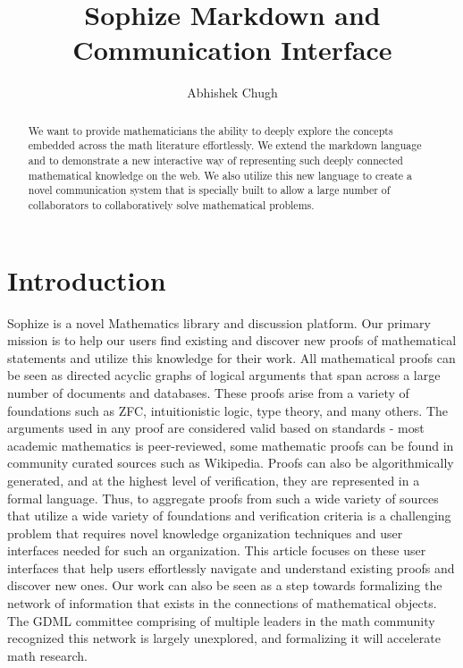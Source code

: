 \documentclass[a4paper]{article}
\title{Sophize Markdown and Communication Interface }
\author{
Abhishek Chugh
}
\begin{document}
\maketitle

\begin{abstract}
We want to provide mathematicians the ability to deeply explore the concepts embedded across the math literature effortlessly. We extend the markdown language and to demonstrate a new interactive way of representing such deeply connected mathematical knowledge on the web. We also utilize this new language to create a novel communication system that is specially built to allow a large number of collaborators to collaboratively solve mathematical problems.
\end{abstract}
\vskip 32pt


\section{Introduction}

Sophize is a novel Mathematics library and discussion platform. Our primary mission is to help our users find existing and discover new proofs of mathematical statements and utilize this knowledge for their work. All mathematical proofs can be seen as directed acyclic graphs of logical arguments that span across a large number of documents and databases. These proofs arise from a variety of foundations such as ZFC, intuitionistic logic, type theory, and many others. The arguments used in any proof are considered valid based on standards - most academic mathematics is peer-reviewed, some mathematic proofs can be found in community curated sources such as Wikipedia. Proofs can also be algorithmically generated, and at the highest level of verification, they are represented in a formal language. Thus, to aggregate proofs from such a wide variety of sources that utilize a wide variety of foundations and verification criteria is a challenging problem that requires novel knowledge organization techniques and user interfaces needed for such an organization. This article focuses on these user interfaces that help users effortlessly navigate and understand existing proofs and discover new ones.  Our work can also be seen as a step towards formalizing the network of information that exists in the connections of mathematical objects. The GDML committee comprising of multiple leaders in the math community recognized this network is largely unexplored, and formalizing it will accelerate math research. 
\end{document}
